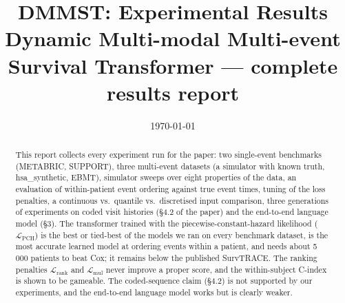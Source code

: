 \documentclass[11pt,a4paper]{article}
\title{DMMST: Experimental Results\\[2pt]
\large Dynamic Multi-modal Multi-event Survival Transformer --- complete results report}
\date{\today}
\author{}
\newcommand{\Lpch}{$\mathcal{L}_{\mathrm{PCH}}$}
\newcommand{\Lrank}{$\mathcal{L}_{\mathrm{rank}}$}
\newcommand{\Lmul}{$\mathcal{L}_{\mathrm{mul}}$}
\begin{document}
\sloppy
\maketitle

\begin{abstract}
\noindent
This report collects every experiment run for the paper: two single-event benchmarks (METABRIC, SUPPORT), three
multi-event datasets (a simulator with known truth, hsa\_synthetic, EBMT), simulator sweeps over eight properties of
the data, an evaluation of within-patient event ordering against true event times, tuning of the loss penalties, a
continuous vs.\ quantile vs.\ discretised input comparison, three generations of experiments on coded visit
histories (\S4.2 of the paper) and the end-to-end language model (\S3). The transformer trained with the
piecewise-constant-hazard likelihood (\Lpch{}) is the best or tied-best of the models we ran on every benchmark
dataset, is the most accurate learned model at ordering events within a patient, and needs about 5\,000 patients
to beat Cox; it remains below the published SurvTRACE. The ranking penalties \Lrank{} and \Lmul{} never improve a
proper score, and the within-subject C-index is shown to be gameable. The coded-sequence claim (\S4.2) is not
supported by our experiments, and the end-to-end language model works but is clearly weaker.
\end{abstract}

\tableofcontents

\end{document}
